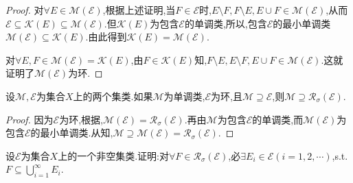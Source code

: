 \documentclass[../../main.tex]{subfiles}%
\begin{document}
\begin{proof}
对$\forall E \in \mathscr{M}(\mathscr{E})$,根据上述证明,当$F \in \mathscr{E}$时,$E \setminus F, F \setminus E, E \cup F \in \mathscr{M}(\mathscr{E})$,从而$\mathscr{E} \subseteq \mathscr{K}(E) \subseteq \mathscr{M}(\mathscr{E})$.但$\mathscr{K}(E)$为包含$\mathscr{E}$的单调类,所以,包含$\mathscr{E}$的最小单调类$\mathscr{M}(\mathscr{E}) \subseteq \mathscr{K}(E)$.由此得到$\mathscr{K}(E) = \mathscr{M}(\mathscr{E})$.

对$\forall E,F \in \mathscr{M}(\mathscr{E}) = \mathscr{K}(E)$,由$F \in \mathscr{K}(E)$知,$F \setminus E, E \setminus F, E \cup F \in \mathscr{M}(\mathscr{E})$.这就证明了$\mathscr{M}(\mathscr{E})$为环.

\end{proof}

\begin{corollary}
设$\mathscr{M},\mathscr{E}$为集合$X$上的两个集类.如果$\mathscr{M}$为单调类,$\mathscr{E}$为环,且$\mathscr{M} \supseteq \mathscr{E}$,则$\mathscr{M} \supseteq \mathscr{R}_\sigma(\mathscr{E})$.
\end{corollary}

\begin{proof}

因为$\mathscr{E}$为环,根据,$\mathscr{M}(\mathscr{E}) = \mathscr{R}_\sigma(\mathscr{E})$.再由$\mathscr{M}$为包含$\mathscr{E}$的单调类,而$\mathscr{M}(\mathscr{E})$为包含$\mathscr{E}$的最小单调类.从知,$\mathscr{M} \supseteq \mathscr{M}(\mathscr{E}) = \mathscr{R}_\sigma(\mathscr{E})$.

\end{proof}

\begin{example}
设$\mathscr{E}$为集合$X$上的一个非空集类.证明:对$\forall F \in \mathscr{R}_\sigma(\mathscr{E})$,必$\exists E_i \in \mathscr{E}(i=1,2,\cdots)$,s.t. $F \subseteq \bigcup_{i=1}^{\infty} E_i$.
\end{example}
\end{document}
